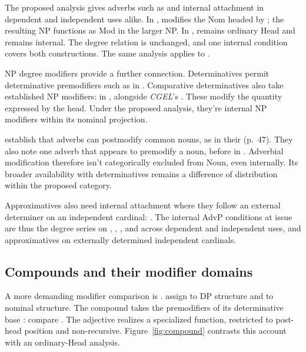 \documentclass[12pt]{article}
\begin{document}
The proposed analysis gives adverbs such as  and  internal attachment in dependent and independent uses alike. In ,  modifies the Nom headed by ; the resulting  NP functions as Mod in the larger NP. In ,  remains ordinary Head and  remains internal. The degree relation is unchanged, and one internal condition covers both constructions. The same analysis applies to .

NP degree modifiers provide a further connection. Determinatives permit determinative premodifiers such as  in  \citep[393]{huddleston2002}. Comparative determinatives also take established NP modifiers:  in , alongside \textit{CGEL}'s  \citep[432]{huddleston2002}. These modify the quantity expressed by the head. Under the proposed analysis, they're internal NP modifiers within its nominal projection.

\textcite[42--47]{payne2010} establish that adverbs can postmodify common nouns, as in their  (p.~47). They also note one adverb that appears to premodify a noun,  before  in  \citep[p.~75, n.~3]{payne2010}. Adverbial modification therefore isn't categorically excluded from Noun, even internally. Its broader availability with determinatives remains a difference of distribution within the proposed category.

Approximatives also need internal attachment where they follow an external determiner on an independent cardinal: . The internal AdvP conditions at issue are thus the degree series on , , , and  across dependent and independent uses, and approximatives on externally determined independent cardinals.

\subsection{Compounds and their modifier domains}\label{sec:compounds}

A more demanding modifier comparison is . \textcite[581--583]{Payne2007} assign  to DP structure and  to nominal structure. The compound  takes the premodifiers of its determinative base : compare . The adjective realizes a specialized  function, restricted to post-head position and non-recursive. Figure~\ref{fig:compound} contrasts this account with an ordinary-Head analysis.
\end{document}
